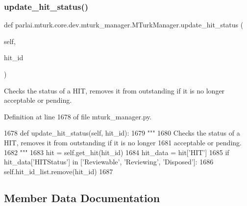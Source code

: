 \subsubsection{\texorpdfstring{update\+\_\+hit\+\_\+status()}{update\_hit\_status()}}
{\footnotesize\ttfamily def parlai.\+mturk.\+core.\+dev.\+mturk\+\_\+manager.\+M\+Turk\+Manager.\+update\+\_\+hit\+\_\+status (\begin{DoxyParamCaption}\item[{}]{self,  }\item[{}]{hit\+\_\+id }\end{DoxyParamCaption})}

\begin{DoxyVerb}Checks the status of a HIT, removes it from outstanding if it is no longer
acceptable or pending.
\end{DoxyVerb}
 

Definition at line 1678 of file mturk\+\_\+manager.\+py.


\begin{DoxyCode}
1678     \textcolor{keyword}{def }update\_hit\_status(self, hit\_id):
1679         \textcolor{stringliteral}{"""}
1680 \textcolor{stringliteral}{        Checks the status of a HIT, removes it from outstanding if it is no longer}
1681 \textcolor{stringliteral}{        acceptable or pending.}
1682 \textcolor{stringliteral}{        """}
1683         hit = self.get\_hit(hit\_id)
1684         hit\_data = hit[\textcolor{stringliteral}{'HIT'}]
1685         \textcolor{keywordflow}{if} hit\_data[\textcolor{stringliteral}{'HITStatus'}] \textcolor{keywordflow}{in} [\textcolor{stringliteral}{'Reviewable'}, \textcolor{stringliteral}{'Reviewing'}, \textcolor{stringliteral}{'Disposed'}]:
1686             self.hit\_id\_list.remove(hit\_id)
1687 
\end{DoxyCode}


\subsection{Member Data Documentation}
\mbox{\label{classparlai_1_1mturk_1_1core_1_1dev_1_1mturk__manager_1_1MTurkManager_ac579c665f4bf5d0ff4b43d41f4460c3b}} 
